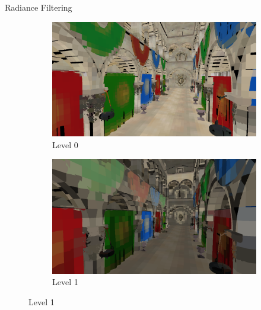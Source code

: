 \documentclass[10pt]{beamer}
\begin{document}
\begin{frame}{Radiance Filtering}
  \begin{figure}
    \centering
    \begin{subfigure}[b]{0.475\textwidth}
        \centering
        \includegraphics[width=\textwidth]{mipmap0.png}
        \caption*{Level 0}
    \end{subfigure}
    \hfill
    \begin{subfigure}[b]{0.475\textwidth}
        \centering
        \includegraphics[width=\textwidth]{mipmap1.png}
        \caption*{Level 1}
    \end{subfigure}


\end{figure}
\end{frame}
\end{document}
